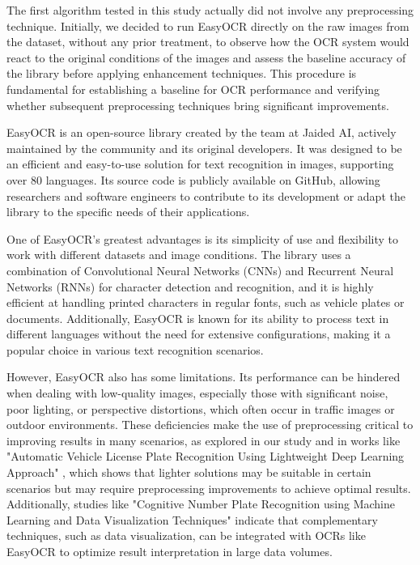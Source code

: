 \documentclass[conference]{IEEEtran}
\begin{document}
    The first algorithm tested in this study actually did not involve any preprocessing technique. Initially, we decided to run EasyOCR directly on the raw images from the dataset, without any prior treatment, to observe how the OCR system would react to the original conditions of the images and assess the baseline accuracy of the library before applying enhancement techniques. This procedure is fundamental for establishing a baseline for OCR performance and verifying whether subsequent preprocessing techniques bring significant improvements.
    
    EasyOCR is an open-source library created by the team at Jaided AI, actively maintained by the community and its original developers. It was designed to be an efficient and easy-to-use solution for text recognition in images, supporting over 80 languages. Its source code is publicly available on GitHub, allowing researchers and software engineers to contribute to its development or adapt the library to the specific needs of their applications.
    
    One of EasyOCR's greatest advantages is its simplicity of use and flexibility to work with different datasets and image conditions. The library uses a combination of Convolutional Neural Networks (CNNs) and Recurrent Neural Networks (RNNs) for character detection and recognition, and it is highly efficient at handling printed characters in regular fonts, such as vehicle plates or documents. Additionally, EasyOCR is known for its ability to process text in different languages without the need for extensive configurations, making it a popular choice in various text recognition scenarios.
    
    However, EasyOCR also has some limitations. Its performance can be hindered when dealing with low-quality images, especially those with significant noise, poor lighting, or perspective distortions, which often occur in traffic images or outdoor environments. These deficiencies make the use of preprocessing critical to improving results in many scenarios, as explored in our study and in works like "Automatic Vehicle License Plate Recognition Using Lightweight Deep Learning Approach" \cite{b5}, which shows that lighter solutions may be suitable in certain scenarios but may require preprocessing improvements to achieve optimal results. Additionally, studies like "Cognitive Number Plate Recognition using Machine Learning and Data Visualization Techniques" \cite{b6} indicate that complementary techniques, such as data visualization, can be integrated with OCRs like EasyOCR to optimize result interpretation in large data volumes.
    
\end{document}
